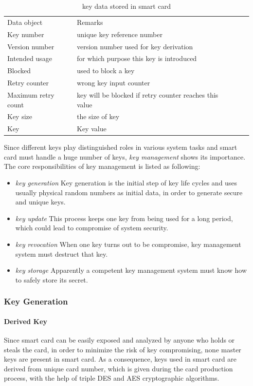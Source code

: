 \begin{table}[!htbp]
\caption{key data stored in smart card\cite{handbook}}
\begin{tabular}{lllll}
\hline\hline
Data object & Remarks\\[0.5ex]
Key number & unique key reference number\\
Version number & version number used for key derivation\\
Intended usage & for which purpose this key is introduced\\
Blocked & used to block a key\\
Retry counter & wrong key input counter\\
Maximum retry count & key will be blocked if retry counter reaches this value\\
Key size & the size of key\\
Key & Key value\\
\hline
\end{tabular}
\label{table:smart-card-key}
\end{table}

Since different keys play distinguished roles in various system tasks and smart card must handle a huge number of keys, \emph{key management} shows its importance. The core responsibilities of key management is listed as following\cite{handbook}:
\begin{itemize}
\item \emph{key generation} Key generation is the initial step of key life cycles and uses usually physical random numbers as initial data, in order to generate secure and unique keys. 
\item \emph{key update} This process keeps one key from being used for a long period, which could lead to compromise of system security.
\item \emph{key revocation} When one key turns out to be compromise, key management system must destruct that key.
\item \emph{key storage} Apparently a competent key management system must know how to safely store its secret.
\end{itemize}
\subsubsection{Key Generation}
\paragraph{Derived Key}
Since smart card can be easily exposed and analyzed by anyone who holds or steals the card, in order to minimize the risk of key compromising, none master keys are present in smart card. As a consequence, keys used in smart card are derived from unique card number, which is given during the card production process, with the help of triple DES and AES cryptographic algorithms\cite{handbook}.
